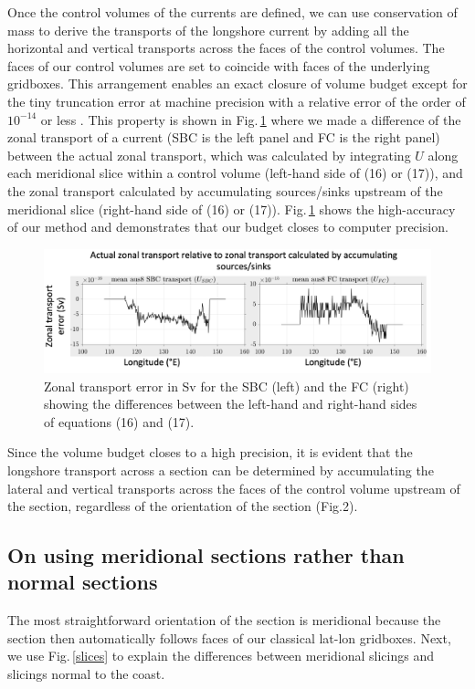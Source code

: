 \documentclass[preprint,3p,review,12pt]{elsarticle}
\begin{document}
Once the control volumes of the currents are defined, we can use conservation of mass to derive the transports of the longshore current by adding all the horizontal and vertical transports across the faces of the control volumes. The faces of our control volumes are set to coincide with faces of the underlying gridboxes. This arrangement enables an exact closure of volume budget except for the tiny truncation error at machine precision with a relative error of the order of $10^{-14}$ or less
\citep{Furue2019}. This property is shown in Fig.\,\ref{Slide1_2} where we made a difference of the zonal transport of a current (SBC is the left panel and FC is the right panel) between the actual zonal transport, which was calculated by integrating $U$ along each meridional slice within a control volume (left-hand side of (16) or (17)), and the zonal transport calculated by accumulating sources/sinks upstream of the meridional slice (right-hand side of (16) or (17)). Fig.\,\ref{Slide1_2} shows the high-accuracy of our method and demonstrates that our budget closes to computer precision.
%
\begin{figure}[tb]
    \includegraphics[width=1\textwidth, height=1\textheight, keepaspectratio]{Slide1_2.jpg}
    \caption{\label{Slide1_2}%
    Zonal transport error in Sv for the SBC (left) and the FC (right) showing the differences between the left-hand and right-hand sides of equations (16) and (17).}
\end{figure}

Since the volume budget closes to a high precision, it is evident that the longshore transport across a section can be determined by accumulating the lateral and vertical transports across the faces of the control volume upstream of the section, regardless of the orientation of the section (Fig.2).

\subsection{On using meridional sections rather than normal sections}

The most straightforward orientation of the section is meridional because the section then automatically follows faces of our classical lat-lon gridboxes. Next, we use Fig.\,\ref{slices} to explain the differences between meridional slicings and slicings normal to the coast.
\end{document}
